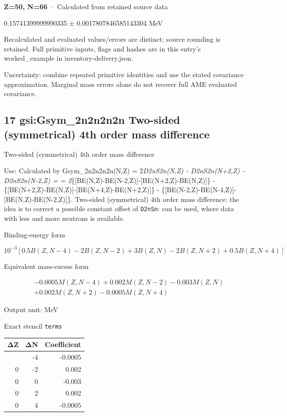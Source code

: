 \documentclass[
  11pt,
  letterpaper,
]{article}
\begin{document}
\textbf{Z=50, N=66} · Calculated from retained source data

0.15741399999990335 ± 0.0017807846585143304 MeV

Recalculated and evaluated values/errors are distinct; source rounding
is retained. Full primitive inputs, flags and hashes are in this entry's
worked\_example in inventory-delivery.json.

Uncertainty: combine repeated primitive identities and use the stated
covariance approximation. Marginal mass errors alone do not recover full
AME evaluated covariance.

\subsection{17 gsi:Gsym\_2n2n2n2n Two-sided (symmetrical) 4th order mass
difference}\label{gsigsym_2n2n2n2n-two-sided-symmetrical-4th-order-mass-difference}

Two-sided (symmetrical) 4th order mass difference

Use: Calculated by Gsym\_2n2n2n2n(N,Z) = 2\emph{D2nS2n(N,Z) -
D2nS2n(N+2,Z) - D2nS2n(N-2,Z) = =
2}\{{[}BE(N,Z)-BE(N-2,Z){]}-{[}BE(N+2,Z)-BE(N,Z){]}\} -
\{{[}BE(N+2,Z)-BE(N,Z){]}-{[}BE(N+4,Z)-BE(N+2,Z){]}\} -
\{{[}BE(N-2,Z)-BE(N-4,Z){]}-{[}BE(N,Z)-BE(N-2,Z){]}\}. Two-sided
(symmetrical) 4th order mass difference: the idea is to correct a
possible constant offset of \texttt{D2nSn}: can be used, where data with
less and more neutrons is available.

Binding-energy form

\[
10^{-3}[0.5B(Z,N-4)-2B(Z,N-2)+3B(Z,N)-2B(Z,N+2)+0.5B(Z,N+4)]
\]

Equivalent mass-excess form

\[
\begin{aligned}
& -0.0005M(Z,N-4)+0.002M(Z,N-2)-0.003M(Z,N) \\
& +0.002M(Z,N+2)-0.0005M(Z,N+4)
\end{aligned}
\]

Output unit: MeV

Exact stencil \texttt{terms}

\begin{longtable}[]{@{}rrr@{}}
\toprule\noalign{}
ΔZ & ΔN & Coefficient \\
\midrule\noalign{}
\endhead
\bottomrule\noalign{}
\endlastfoot
0 & -4 & -0.0005 \\
0 & -2 & 0.002 \\
0 & 0 & -0.003 \\
0 & 2 & 0.002 \\
0 & 4 & -0.0005 \\
\end{longtable}
\end{document}
